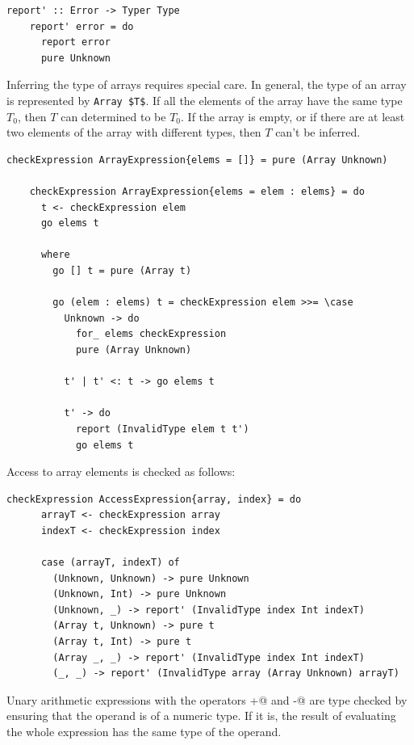 \documentclass[UdineBachThesis,american,11pt]{PhdThesis}
\begin{document}
  \begin{lstlisting}[gobble=4,basicstyle=\ttfamily\small]
    report' :: Error -> Typer Type
    report' error = do
      report error
      pure Unknown
  \end{lstlisting}

  Inferring the type of arrays requires special care. In general, the type of an
  array is represented by \lstinline[mathescape]@Array $T$@. If all the elements
  of the array have the same type $T_0$, then $T$ can determined to be $T_0$. If
  the array is empty, or if there are at least two elements of the array with
  different types, then $T$ can't be inferred.

  \begin{lstlisting}[gobble=4,basicstyle=\ttfamily\small]
    checkExpression ArrayExpression{elems = []} = pure (Array Unknown)

    checkExpression ArrayExpression{elems = elem : elems} = do
      t <- checkExpression elem
      go elems t

      where
        go [] t = pure (Array t)

        go (elem : elems) t = checkExpression elem >>= \case
          Unknown -> do
            for_ elems checkExpression
            pure (Array Unknown)

          t' | t' <: t -> go elems t

          t' -> do
            report (InvalidType elem t t')
            go elems t
  \end{lstlisting}

  Access to array elements is checked as follows:

  \begin{lstlisting}[gobble=4,basicstyle=\ttfamily\small]
    checkExpression AccessExpression{array, index} = do
      arrayT <- checkExpression array
      indexT <- checkExpression index

      case (arrayT, indexT) of
        (Unknown, Unknown) -> pure Unknown
        (Unknown, Int) -> pure Unknown
        (Unknown, _) -> report' (InvalidType index Int indexT)
        (Array t, Unknown) -> pure t
        (Array t, Int) -> pure t
        (Array _, _) -> report' (InvalidType index Int indexT)
        (_, _) -> report' (InvalidType array (Array Unknown) arrayT)
  \end{lstlisting}

  Unary arithmetic expressions with the operators \lstinline@+@ and
  \lstinline@-@ are type checked by ensuring that the operand is of a numeric
  type. If it is, the result of evaluating the whole expression has the same
  type of the operand.
\end{document}

